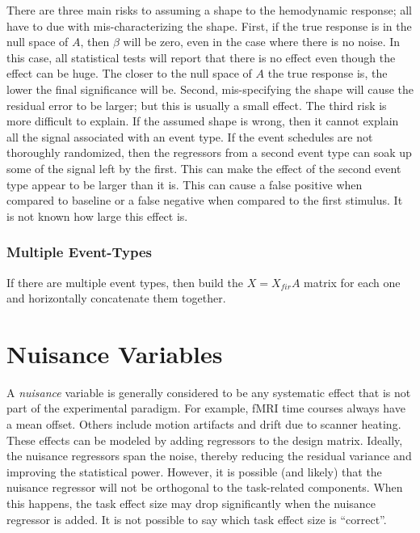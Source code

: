 \documentclass{article}
\begin{document}
\noindent
There are three main risks to assuming a shape to the hemodynamic
response; all have to due with mis-characterizing the shape. First, if
the true response is in the null space of $A$, then $\beta$ will be
zero, even in the case where there is no noise. In this case, all
statistical tests will report that there is no effect even though the
effect can be huge. The closer to the null space of $A$ the true
response is, the lower the final significance will be. Second,
mis-specifying the shape will cause the residual error to be larger;
but this is usually a small effect. The third risk is more difficult
to explain. If the assumed shape is wrong, then it cannot explain
all the signal associated with an event type. If the event schedules
are not thoroughly randomized, then the regressors from a second event
type can soak up some of the signal left by the first. This can make
the effect of the second event type appear to be larger than it
is. This can cause a false positive when compared to baseline or a
false negative when compared to the first stimulus. It is not known
how large this effect is.

\subsubsection{Multiple Event-Types}

\noindent
If there are multiple event types, then build the $X = X_{fir} A$
matrix for each one and horizontally concatenate them together.

\section{Nuisance Variables}

A {\em nuisance} variable is generally considered to be any systematic
effect that is not part of the experimental paradigm. For example,
fMRI time courses always have a mean offset. Others include motion
artifacts and drift due to scanner heating. These effects can be
modeled by adding regressors to the design matrix. Ideally, the
nuisance regressors span the noise, thereby reducing the residual
variance and improving the statistical power. However, it is possible
(and likely) that the nuisance regressor will not be orthogonal to the
task-related components. When this happens, the task effect size may
drop significantly when the nuisance regressor is added. It is not
possible to say which task effect size is ``correct''.\\
\end{document}
